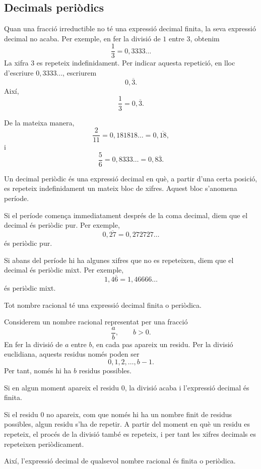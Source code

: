 \subsection{Decimals periòdics}

Quan una fracció irreductible no té una expressió decimal finita, la seva expressió decimal no acaba. Per exemple, en fer la divisió de \(1\) entre \(3\), obtenim
\[
	\frac{1}{3}=0{,}3333\ldots
\]
La xifra \(3\) es repeteix indefinidament. Per indicar aquesta repetició, en lloc d'escriure \(0{,}3333\ldots\), escriurem
\[
	0{,}\overline{3}.
\]
Així,
\[
	\frac{1}{3}=0{,}\overline{3}.
\]

De la mateixa manera,
\[
	\frac{2}{11}=0{,}181818\ldots=0{,}\overline{18},
\]
i
\[
	\frac{5}{6}=0{,}8333\ldots=0{,}8\overline{3}.
\]

\begin{definicio}
Un decimal periòdic és una expressió decimal en què, a partir d'una certa posició, es repeteix indefinidament un mateix bloc de xifres. Aquest bloc s'anomena període.
\end{definicio}

Si el període comença immediatament després de la coma decimal, diem que el decimal és periòdic pur. Per exemple,
\[
	0{,}\overline{27}=0{,}272727\ldots
\]
és periòdic pur.

Si abans del període hi ha algunes xifres que no es repeteixen, diem que el decimal és periòdic mixt. Per exemple,
\[
	1{,}4\overline{6}=1{,}46666\ldots
\]
és periòdic mixt.

\begin{proposicio}
Tot nombre racional té una expressió decimal finita o periòdica.
\end{proposicio}

\begin{prova}
Considerem un nombre racional representat per una fracció
\[
	\frac{a}{b},
	\qquad b>0.
\]
En fer la divisió de \(a\) entre \(b\), en cada pas apareix un residu. Per la divisió euclidiana, aquests residus només poden ser
\[
	0,1,2,\ldots,b-1.
\]
Per tant, només hi ha \(b\) residus possibles.

Si en algun moment apareix el residu \(0\), la divisió acaba i l'expressió decimal és finita.

Si el residu \(0\) no apareix, com que només hi ha un nombre finit de residus possibles, algun residu s'ha de repetir. A partir del moment en què un residu es repeteix, el procés de la divisió també es repeteix, i per tant les xifres decimals es repeteixen periòdicament.

Així, l'expressió decimal de qualsevol nombre racional és finita o periòdica.
\end{prova}

